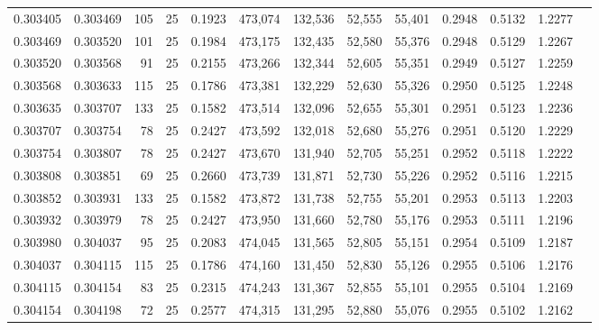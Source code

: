 \begin{tabular}{rrrrrrrrrrrrr}
0.303405 & 0.303469 &   105 &  25 &                                     0.1923 & 473,074 & 132,536 &  52,555 &  55,401 & 0.2948 & 0.5132 & 1.2277 \\
0.303469 & 0.303520 &   101 &  25 &                                     0.1984 & 473,175 & 132,435 &  52,580 &  55,376 & 0.2948 & 0.5129 & 1.2267 \\
0.303520 & 0.303568 &    91 &  25 &                                     0.2155 & 473,266 & 132,344 &  52,605 &  55,351 & 0.2949 & 0.5127 & 1.2259 \\
0.303568 & 0.303633 &   115 &  25 &                                     0.1786 & 473,381 & 132,229 &  52,630 &  55,326 & 0.2950 & 0.5125 & 1.2248 \\
0.303635 & 0.303707 &   133 &  25 &                                     0.1582 & 473,514 & 132,096 &  52,655 &  55,301 & 0.2951 & 0.5123 & 1.2236 \\
0.303707 & 0.303754 &    78 &  25 &                                     0.2427 & 473,592 & 132,018 &  52,680 &  55,276 & 0.2951 & 0.5120 & 1.2229 \\
0.303754 & 0.303807 &    78 &  25 &                                     0.2427 & 473,670 & 131,940 &  52,705 &  55,251 & 0.2952 & 0.5118 & 1.2222 \\
0.303808 & 0.303851 &    69 &  25 &                                     0.2660 & 473,739 & 131,871 &  52,730 &  55,226 & 0.2952 & 0.5116 & 1.2215 \\
0.303852 & 0.303931 &   133 &  25 &                                     0.1582 & 473,872 & 131,738 &  52,755 &  55,201 & 0.2953 & 0.5113 & 1.2203 \\
0.303932 & 0.303979 &    78 &  25 &                                     0.2427 & 473,950 & 131,660 &  52,780 &  55,176 & 0.2953 & 0.5111 & 1.2196 \\
0.303980 & 0.304037 &    95 &  25 &                                     0.2083 & 474,045 & 131,565 &  52,805 &  55,151 & 0.2954 & 0.5109 & 1.2187 \\
0.304037 & 0.304115 &   115 &  25 &                                     0.1786 & 474,160 & 131,450 &  52,830 &  55,126 & 0.2955 & 0.5106 & 1.2176 \\
0.304115 & 0.304154 &    83 &  25 &                                     0.2315 & 474,243 & 131,367 &  52,855 &  55,101 & 0.2955 & 0.5104 & 1.2169 \\
0.304154 & 0.304198 &    72 &  25 &                                     0.2577 & 474,315 & 131,295 &  52,880 &  55,076 & 0.2955 & 0.5102 & 1.2162 \\

\end{tabular}
